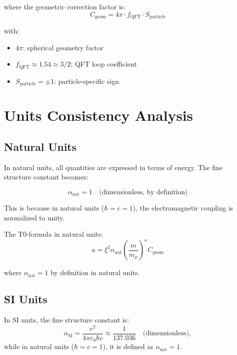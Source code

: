 \documentclass[12pt,a4paper]{article}
\newcommand{\xipar}{\xi}
\newcommand{\alphaSI}{\alpha_{\text{SI}}}
\newcommand{\alphaNAT}{\alpha_{\text{nat}}}
\newcommand{\Cgeom}{C_{\text{geom}}}
\newcommand{\fQFT}{f_{\text{QFT}}}
\newcommand{\Sparticle}{S_{\text{particle}}}
\newcommand{\kappaT}{\kappa}
\newcommand{\mmu}{m_{\mu}}
\begin{document}
	where the geometric correction factor is:
	\begin{equation}
		\Cgeom = 4\pi \cdot \fQFT \cdot \Sparticle
	\end{equation}
	
	with:
	\begin{itemize}
		\item $4\pi$: spherical geometry factor
		\item $\fQFT \approx 1.54 \approx 3/2$: QFT loop coefficient
		\item $\Sparticle = \pm 1$: particle-specific sign
	\end{itemize}
	
	\section{Units Consistency Analysis}
	
	\subsection{Natural Units}
	
	In natural units, all quantities are expressed in terms of energy. The fine structure constant becomes:
	
	\begin{equation}
		\alphaNAT = 1 \quad \text{(dimensionless, by definition)}
	\end{equation}
	
	This is because in natural units ($\hbar = c = 1$), the electromagnetic coupling is normalized to unity.
	
	The T0-formula in natural units:
	\begin{equation}
		a = \xipar^2 \alphaNAT \left(\frac{m}{\mmu}\right)^{\kappaT} \Cgeom
	\end{equation}
	
	where $\alphaNAT = 1$ by definition in natural units.
	
	\subsection{SI Units}
	
	In SI units, the fine structure constant is:
	\begin{equation}
		\alphaSI = \frac{e^2}{4\pi\varepsilon_0\hbar c} \approx \frac{1}{137.036} \quad \text{(dimensionless)},
	\end{equation}
	while in natural units ($\hbar = c = 1$), it is defined as $\alphaNAT = 1$.
	
\end{document}
